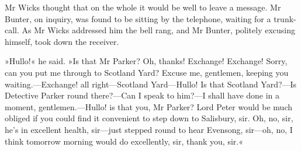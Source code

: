 Mr Wicks thought that on the whole it would be well to leave a message. Mr Bunter, on inquiry, was found to be sitting by the telephone, waiting for a trunk-call. As Mr Wicks addressed him the bell rang, and Mr Bunter, politely excusing himself, took down the receiver.

»Hullo!« he said. »Is that Mr Parker? Oh, thanks! Exchange! Exchange! Sorry, can you put me through to Scotland Yard? Excuse me, gentlemen, keeping you waiting.---Exchange! all right\allowbreak---\allowbreak Scotland Yard\allowbreak---\allowbreak Hullo! Is that Scotland Yard?---Is Detective Parker round there?---Can I speak to him?---I shall have done in a moment, gentlemen.---Hullo! is that you, Mr Parker? Lord Peter would be much obliged if you could find it convenient to step down to Salisbury, sir. Oh, no, sir, he's in excellent health, sir\allowbreak---\allowbreak just stepped round to hear Evensong, sir\allowbreak---\allowbreak oh, no, I think tomorrow morning would do excellently, sir, thank you, sir.«